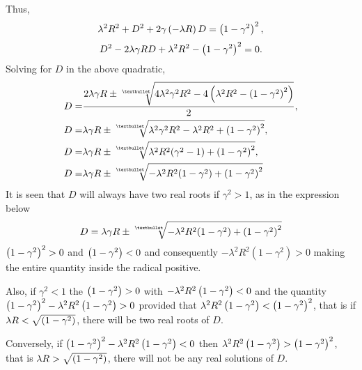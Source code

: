 Thus,
\[
	\lambda^2 R^2 + D^2 + 2\gamma\left(-\lambda R\right) D = \left(1-\gamma^2\right)^2,
\]
\[
	D^2 - 2\lambda\gamma RD + \lambda^2R^2 - \left(1-\gamma^2\right)^2 = 0.
\]
Solving for $D$ in the above quadratic,
\begin{align*}
	D =& \frac{ 
				2\lambda\gamma R \pm \sqrt[•]{4\lambda^2\gamma^2 R^2 - 4 \lr{\lambda^2R^2 - \lr{1-\gamma^2}^2}}
	    }
	    {
	    			2
	    },\\
	D =& \lambda\gamma R \pm \sqrt[•]{\lambda^2\gamma^2 R^2 -\lambda^2R^2 + \lr{1-\gamma^2}^2},\\
	D =& \lambda\gamma R \pm \sqrt[•]{\lambda^2R^2(\gamma^2 -1) + \lr{1-\gamma^2}^2},\\
	D =& \lambda\gamma R \pm \sqrt[•]{-\lambda^2R^2(1-\gamma^2) + \lr{1-\gamma^2}^2}
\end{align*}
It is seen that $D$ will always have two real roots if $\gamma^2 > 1$, as in the expression below
\[
	D = \lambda\gamma R \pm \sqrt[•]{-\lambda^2R^2(1-\gamma^2) + \lr{1-\gamma^2}^2}
\]
$\left(1-\gamma^2\right)^2 > 0$ and $\left(1-\gamma^2\right) < 0$ and consequently $-\lambda^2R^2(1-\gamma^2)> 0$ making the entire quantity inside the radical positive.

Also, if $\gamma^2 < 1$ the $\left(1-\gamma^2\right) > 0$ with $-\lambda^2R^2\left(1-\gamma^2\right) < 0$ and the quantity $\left(1-\gamma^2\right)^2 - \lambda^2R^2\left(1-\gamma^2\right)>0$ provided that $\lambda^2R^2\left(1-\gamma^2\right) < \left(1-\gamma^2\right)^2$, that is if $\lambda R < \sqrt{\left(1-\gamma^2\right)}$, there will be two real roots of $D$.

Conversely, if $\left(1-\gamma^2\right)^2 - \lambda^2R^2\left(1-\gamma^2\right)<0$ then $\lambda^2R^2\left(1-\gamma^2\right) > \left(1-\gamma^2\right)^2$, that is $\lambda R > \sqrt{\left(1-\gamma^2\right)}$, there will not be any real solutions of $D$.